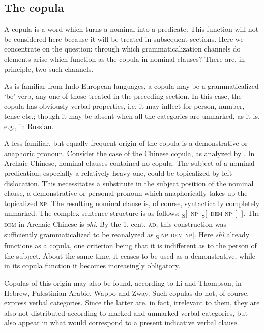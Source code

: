 \subsection{The copula} \label{sec:3.1.2}

A copula is a word which turns a nominal into a predicate. This function will not be considered here because it will be treated in subsequent sections. Here we concentrate on the question: through which grammaticalization channels do elements arise which function as the copula in nominal clauses? There are, in principle, two such channels.

As is familiar from Indo-European languages, a copula may be a grammaticalized ‘be’-verb, any one of those treated in the preceding section. In this case, the copula has obviously verbal properties, i.e. it may inflect for person, number, tense etc.; though it may be absent when all the categories are unmarked, as it is, e.g., in Russian.

A less familiar, but equally frequent origin of the copula is a demonstrative or anaphoric pronoun. Consider the case of the Chinese copula, as analyzed by \citet{LiEtAl1977}. In Archaic Chinese, nominal clauses contained no copula. The subject of a nominal predication, especially a relatively heavy one, could be topicalized by left-dislocation. This necessitates a substitute in the subject position of the nominal clause, a demonstrative or personal pronoun which anaphorically takes up the topicalized \textsc{np}. The resulting nominal clause is, of course, syntactically completely unmarked. The complex sentence structure is as follows: \textsubscript{S}[~\textsc{np}~\textsubscript{S}[~\textsc{dem} \textsc{np}~]~]. The \textsc{dem} in Archaic Chinese is \textit{shì}. By the 1. cent. \textsc{ad}, this construction was sufficiently grammaticalized to be reanalyzed as \textsubscript{S}[\textsc{np} \textsc{dem} \textsc{np}]. Here \textit{shì} already functions as a copula, one criterion being that it is indifferent as to the person of the subject. About the same time, it ceases to be used as a demonstrative, while in its copula function it becomes increasingly obligatory.

Copulas of this origin may also be found, according to Li and Thompson, in Hebrew, Palestinian Arabic, Wappo and Zway. Such copulas do not, of course, express verbal categories. Since the latter are, in fact, irrelevant to them, they are also not distributed according to marked and unmarked verbal categories, but also appear in what would correspond to a present indicative verbal clause.

